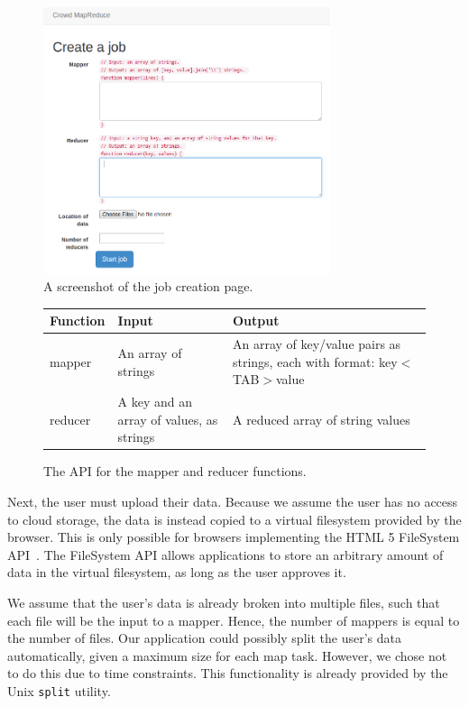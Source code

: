 \documentclass{article} %
\begin{document}
\begin{figure}[h]
  \centering
    \includegraphics[width=0.75\textwidth]{create}
    \caption{A screenshot of the job creation page.}
    \label{creationpage}
\end{figure}

\begin{figure}[h]
  \begin{tabular}{| l | p{5.5cm} | p{6cm} |}
    \hline
    Function & Input & Output \\ \hline
    mapper & An array of strings & An array of key/value pairs as strings, each
    with format:
    key$<$TAB$>$value \\ \hline
    reducer & A key and an array of values, as strings & A reduced array
    of string values
    \\
    \hline
  \end{tabular}
  \caption{The API for the mapper and reducer functions.}
  \label{api}
\end{figure}

Next, the user must upload their data. Because we assume the user has no access
to cloud storage, the data is instead copied to a virtual filesystem provided by
the browser. This is only possible for browsers implementing the HTML 5
FileSystem API~\cite{html5file}. The FileSystem API allows applications to store
an arbitrary amount of data in the virtual filesystem, as long as the user
approves it.

We assume that the user's data is already broken into multiple files, such that
each file will be the input to a mapper. Hence, the number of mappers is equal
to the number of files. Our application could possibly split the user's data
automatically, given a maximum size for each map task. However, we chose not to
do this due to time constraints. This functionality is already provided by the
Unix \texttt{split} utility.
\end{document}
